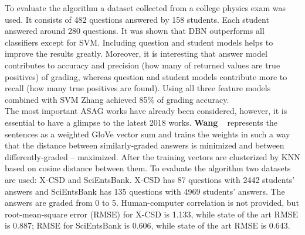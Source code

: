 To evaluate the algorithm a dataset collected from a college physics exam was used. It consists of 482 questions answered by 158 students. Each student answered around 280  questions. It was shown that DBN outperforms all classifiers except for SVM. Including question and student models helps to improve the results greatly. Moreover, it is interesting that answer model contributes to accuracy and precision (how many of returned values are true positives) of grading, whereas question and student models contribute more to recall (how many true positives are found). Using all three feature models combined with SVM Zhang achieved 85\% of grading accuracy.\\

The most important ASAG works have already been considered, however, it is essential to have a glimpse to the latest 2018 works. \textbf{Wang} ~\cite{Wang} represents the sentences as a weighted GloVe vector sum and trains the weights in such a way that the distance between similarly-graded answers is minimized and between differently-graded -- maximized. After the training vectors are clusterized by KNN based on cosine distance between them. To evaluate the algorithm two datasets are used: X-CSD and SciEntsBank. X-CSD has 87 questions with 2442 students' answers and SciEntsBank has 135 questions with 4969 students' answers. The answers are graded from 0 to 5. Human-computer correlation is not provided, but root-mean-square error (RMSE) for X-CSD is 1.133, while state of the art RMSE is 0.887; RMSE for SciEntsBank is 0.606, while state of the art RMSE is 0.643.\\

